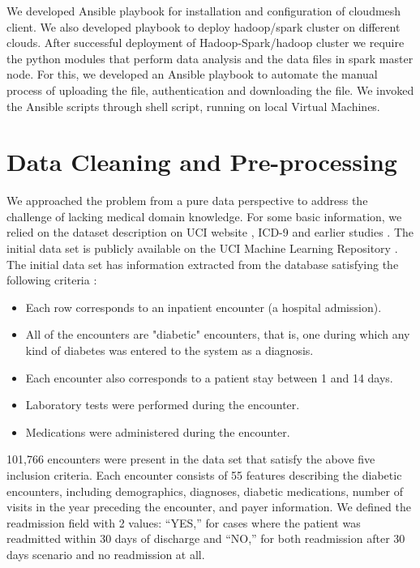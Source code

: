 \documentclass[9pt,twocolumn,twoside]{styles/osajnl}
\begin{document}
 We developed Ansible playbook for installation and configuration of cloudmesh client. We also developed playbook to deploy hadoop/spark cluster on different clouds. After successful deployment of Hadoop-Spark/hadoop cluster we require the python modules that perform data analysis and the data files in spark master node. For this, we developed an Ansible playbook to automate the manual process of uploading the file, authentication and downloading the file. We invoked the Ansible scripts through shell script, running on local Virtual Machines.


\section{Data Cleaning and Pre-processing}
We approached the problem from a pure data perspective to address the challenge of lacking medical domain knowledge. For some basic information, we relied on the dataset description on UCI website \cite{www-dataset}, ICD-9 \cite{www-icd9} and earlier studies \cite{article-hindawi}.
The initial data set is publicly available on the UCI Machine Learning Repository \cite{www-dataset}.
The initial data set has information extracted from the database satisfying the following criteria \cite{article-hindawi}:
\begin{itemize}
    \item Each row corresponds to an inpatient encounter (a hospital admission).
    \item All of the encounters are "diabetic" encounters, that is, one during which any kind of diabetes was entered to the system as a diagnosis.
    \item Each encounter also corresponds to a patient stay between 1 and 14 days.
    \item Laboratory tests were performed during the encounter.
    \item Medications were administered during the encounter.
\end{itemize}

101,766 encounters were present in  the data set that satisfy the above five inclusion criteria. Each encounter consists of 55 features describing the diabetic encounters, including demographics, diagnoses, diabetic medications, number of visits in the year preceding the encounter, and payer information. We defined the readmission  field with 2 values: “YES,” for cases where the patient was readmitted within 30 days of discharge and “NO,” for both readmission after 30 days scenario and no readmission at all.
\end{document}
